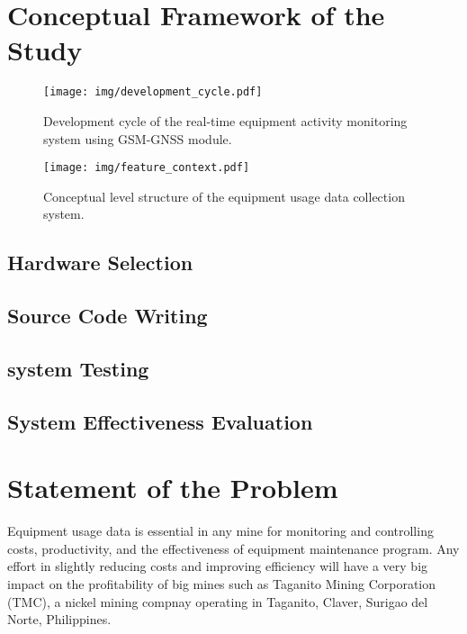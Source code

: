 \documentclass[12pt]{report}
\begin{document}
\section{Conceptual Framework of the Study}

\begin{figure}[H]
    \centering
    \texttt{[image: img/development\_cycle.pdf]}
    \caption{Development cycle of the real-time equipment activity monitoring system using GSM-GNSS module.}
    \label{fig:development_cycle}
\end{figure}

\begin{figure}[H]
    \centering
    \texttt{[image: img/feature\_context.pdf]}
    \caption{Conceptual level structure of the equipment usage data collection system.}
    \label{fig:concept_structure}
\end{figure}

\subsection{Hardware Selection}

\subsection{Source Code Writing}

\subsection{system Testing}

\subsection{System Effectiveness Evaluation}

\section{Statement of the Problem}

Equipment usage data is essential in any mine for monitoring and controlling costs, productivity, and the effectiveness of equipment maintenance program.
Any effort in slightly reducing costs and improving efficiency will have a very big impact on the profitability of big mines such as Taganito Mining Corporation (TMC), a nickel mining compnay operating in Taganito, Claver, Surigao del Norte, Philippines.
\end{document}
